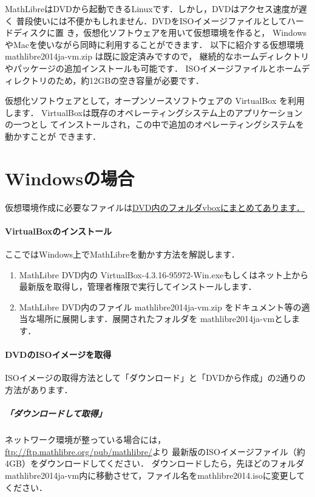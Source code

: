 \documentclass[a4j]{ltjsarticle}
\newcommand{\vboxwin}{VirtualBox-4.3.16-95972-Win.exe}
\newcommand{\vm}{mathlibre2014ja-vm}
\begin{document}
MathLibreはDVDから起動できるLinuxです．しかし，DVDはアクセス速度が遅く
普段使いには不便かもしれません．DVDをISOイメージファイルとしてハードディスクに置
き，仮想化ソフトウェアを用いて仮想環境を作ると，
WindowsやMacを使いながら同時に利用することができます．
以下に紹介する仮想環境 \vm.zip は既に設定済みですので，
継続的なホームディレクトリやパッケージの追加インストールも可能です．
ISOイメージファイルとホームディレクトリのため，約12GBの空き容量が必要です．

仮想化ソフトウェアとして，オープンソースソフトウェアの VirtualBox を利用します．
VirtualBoxは既存のオペレーティングシステム上のアプリケーションの一つとし
てインストールされ，この中で追加のオペレーティングシステムを動かすことが
できます．

\section{Windowsの場合}
仮想環境作成に必要なファイルは\underline{DVD内のフォルダvboxにまとめてあります．}\paragraph{VirtualBoxのインストール}
ここではWindows上でMathLibreを動かす方法を解説します．
\begin{enumerate}
 \item MathLibre DVD内の \vboxwin もしくはネット上から最新版を取得し，管理者権限で実行してインストールします．
 \item MathLibre DVD内のファイル \vm.zip をドキュメント等の適当な場所に展開します．展開されたフォルダを \vm とします．
\end{enumerate}

\paragraph{DVDのISOイメージを取得}

ISOイメージの取得方法として「ダウンロード」と「DVDから作成」の2通りの方法があります．
\subparagraph{「ダウンロードして取得」}

ネットワーク環境が整っている場合には，
\url{ftp://ftp.mathlibre.org/pub/mathlibre/}より
最新版のISOイメージファイル（約4GB）をダウンロードしてください．
ダウンロードしたら，先ほどのフォルダ \vm 内に移動させて，ファイル名をmathlibre2014.isoに変更してください．
\end{document}
